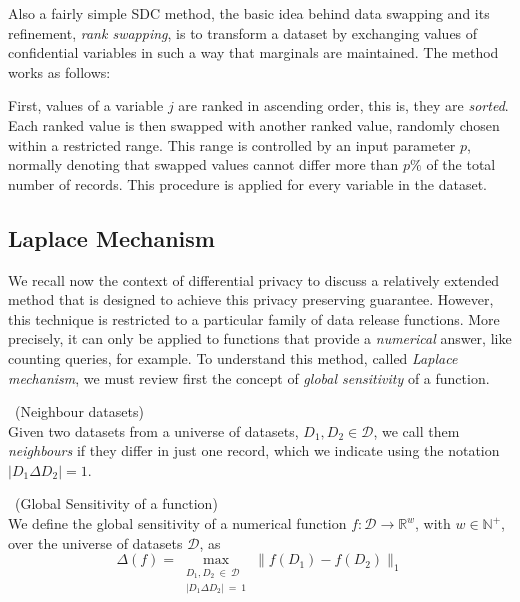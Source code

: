 Also a fairly simple SDC method, the basic idea behind data swapping and its refinement, \textit{rank swapping}, is to transform a dataset by exchanging values of confidential variables in such a way that marginals are maintained. The method works as follows:

First, values of a variable $j$ are ranked in ascending order, this is, they are \textit{sorted}. Each ranked value is then swapped with another ranked value, randomly chosen within a restricted range. This range is controlled by an input parameter $p$, normally denoting that swapped values cannot differ more than $p\%$ of the total number of records. This procedure is applied for every variable in the dataset.

\subsection{Laplace Mechanism}
\label{Theory:SDCMethods:LaplaceMechanism}

We recall now the context of differential privacy to discuss a relatively extended method that is designed to achieve this privacy preserving guarantee. However, this technique is restricted to a particular family of data release functions. More precisely, it can only be applied to functions that provide a \textit{numerical} answer, like counting queries, for example. To understand this method, called \textit{Laplace mechanism}, we must review first the concept of \textit{global sensitivity} of a function.

\begin{definition}~(Neighbour datasets)\\
Given two datasets from a universe of datasets, $D_1, D_2 \in \mathcal{D}$, we call them \textit{neighbours} if they differ in just one record, which we indicate using the notation $|D_1 \Delta D_2| = 1$.
\end{definition}

\begin{definition}~(Global Sensitivity of a function)\\
We define the global sensitivity of a numerical function $f : \mathcal{D} \rightarrow \mathbb{R}^w$, with $w \in \mathbb{N}^+$, over the universe of datasets $\mathcal{D}$, as
\begin{equation}
\Delta(f) = \max\limits_{\substack{D_1, D_2~\in~\mathcal{D} \\ |D_1 \Delta D_2|~=~1}} \lVert f(D_1) - f(D_2) \rVert_{1}
\end{equation}
\end{definition}

